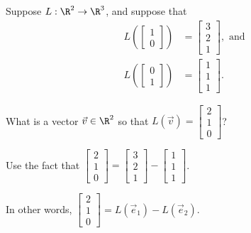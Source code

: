 \documentclass{ximera}
\begin{document}
\begin{question}
  Suppose $L : \R^2 \to \R^3$, and suppose that
  \begin{align*}
    L\left(\begin{bmatrix} 1 \\ 0 \end{bmatrix}\right) &= \begin{bmatrix} 3 \\ 2 \\ 1 \end{bmatrix}, \text{ and} \\
    L\left(\begin{bmatrix} 0 \\ 1 \end{bmatrix}\right) &= \begin{bmatrix} 1 \\ 1 \\ 1 \end{bmatrix}.
  \end{align*}

  What is a vector $\vec{v} \in \R^2$ so that $L(\vec{v}) = \begin{bmatrix} 2 \\ 1 \\ 0 \end{bmatrix}$?

  \begin{solution}
    \begin{hint}
      Use the fact that $\begin{bmatrix} 2 \\ 1 \\ 0 \end{bmatrix} = \begin{bmatrix} 3 \\ 2 \\ 1 \end{bmatrix} - \begin{bmatrix} 1 \\ 1 \\ 1 \end{bmatrix}$.
    \end{hint}

    \begin{hint}
      In other words, $\begin{bmatrix} 2 \\ 1 \\ 0 \end{bmatrix} = L(\vec{e}_1) - L(\vec{e}_2)$.
    \end{hint}


\end{solution}
\end{question}
\end{document}
